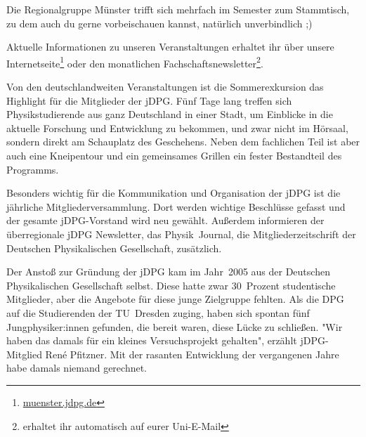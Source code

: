 \begin{multicols}{2}
Die Regionalgruppe Münster trifft sich mehrfach im Semester zum Stammtisch, zu dem auch du gerne vorbeischauen kannst, natürlich unverbindlich ;)


Aktuelle Informationen zu unseren Veranstaltungen erhaltet ihr über unsere Internetseite\footnote{\url{muenster.jdpg.de}} oder den monatlichen Fachschaftsnewsletter\footnote{erhaltet ihr automatisch auf eurer Uni-E-Mail}.

Von den deutschlandweiten Veranstaltungen ist die Sommerexkursion das Highlight für die Mitglieder der jDPG.
Fünf Tage lang treffen sich Physikstudierende aus ganz Deutschland in einer Stadt, um Einblicke in die aktuelle Forschung und Entwicklung zu bekommen, und zwar nicht im Hörsaal, sondern direkt am Schauplatz des Geschehens.
Neben dem fachlichen Teil ist aber auch eine Kneipentour und ein gemeinsames Grillen ein fester Bestandteil des Programms.

Besonders wichtig für die Kommunikation und Organisation der jDPG ist die jährliche Mitgliederversammlung.
Dort werden wichtige Beschlüsse gefasst und der gesamte jDPG-Vorstand wird neu gewählt.
Außerdem informieren der überregionale jDPG Newsletter, das Physik~Journal, die Mitgliederzeitschrift der Deutschen Physikalischen Gesellschaft, zusätzlich.


Der Anstoß zur Gründung der jDPG kam im Jahr~2005 aus der Deutschen Physikalischen Gesellschaft selbst.
Diese hatte zwar 30~Prozent studentische Mitglieder, aber die Angebote für diese junge Zielgruppe fehlten.
Als die DPG auf die Studierenden der TU~Dresden zuging, haben sich spontan fünf Jungphysiker:innen gefunden, die bereit waren, diese Lücke zu schließen.
"Wir haben das damals für ein kleines Versuchsprojekt gehalten", erzählt jDPG-Mitglied René Pfitzner.
Mit der rasanten Entwicklung der vergangenen Jahre habe damals niemand gerechnet.


\end{multicols}
